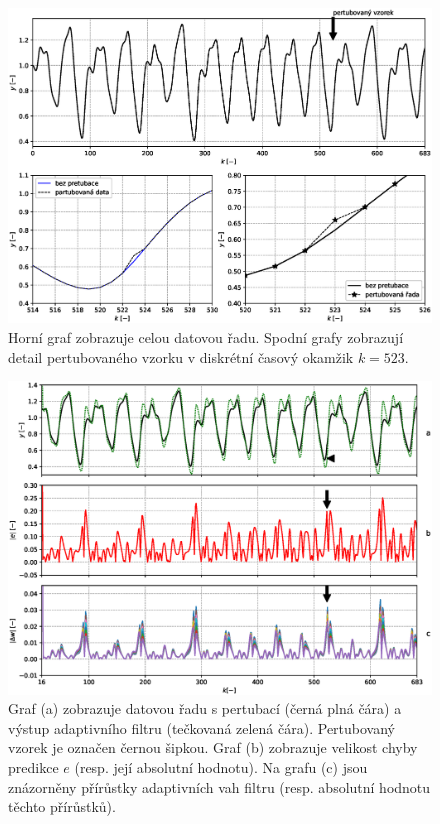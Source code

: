 \begin{figure}[!ht]
    \centering
    \includegraphics[scale=0.56]{IMG/mdpi/mackeydetails_diz.eps}
    \caption{Horní graf zobrazuje celou datovou řadu. Spodní grafy zobrazují detail pertubovaného vzorku v diskrétní časový okamžik $k=523$.}
    \label{fig:mackey_details}
\end{figure}
\begin{figure}[!ht]
    \centering
    \includegraphics[scale=0.56]{IMG/mdpi/mackey_results.eps}
    \caption{Graf (a) zobrazuje datovou řadu s pertubací (černá plná čára) a výstup adaptivního filtru (tečkovaná zelená čára). Pertubovaný vzorek je označen černou šipkou. Graf (b) zobrazuje velikost chyby predikce $e$ (resp. její absolutní hodnotu). Na grafu (c) jsou znázorněny přírůstky adaptivních vah filtru (resp. absolutní hodnotu těchto přírůstků).}
    \label{fig:mackey_results}
\end{figure}

